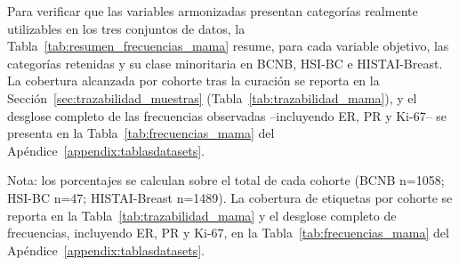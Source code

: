 Para verificar que las variables armonizadas presentan categorías realmente utilizables en los tres conjuntos de datos, la Tabla~\ref{tab:resumen_frecuencias_mama} resume, para cada variable objetivo, las categorías retenidas y su clase minoritaria en BCNB, HSI-BC e HISTAI-Breast. La cobertura alcanzada por cohorte tras la curación se reporta en la Sección~\ref{sec:trazabilidad_muestras} (Tabla~\ref{tab:trazabilidad_mama}), y el desglose completo de las frecuencias observadas --incluyendo ER, PR y Ki-67-- se presenta en la Tabla~\ref{tab:frecuencias_mama} del Apéndice~\ref{appendix:tablasdatasets}.

\begin{table}[htbp]
\centering
\caption{Variables objetivo del dominio de mama: categorías retenidas y clases minoritarias tras la curación.}
\label{tab:resumen_frecuencias_mama}
\small
{}

\vspace{4pt}
Nota: los porcentajes se calculan sobre el total de cada cohorte (BCNB n=1058; HSI-BC n=47; HISTAI-Breast n=1489). La cobertura de etiquetas por cohorte se reporta en la Tabla~\ref{tab:trazabilidad_mama} y el desglose completo de frecuencias, incluyendo ER, PR y Ki-67, en la Tabla~\ref{tab:frecuencias_mama} del Apéndice~\ref{appendix:tablasdatasets}.
\end{table}

